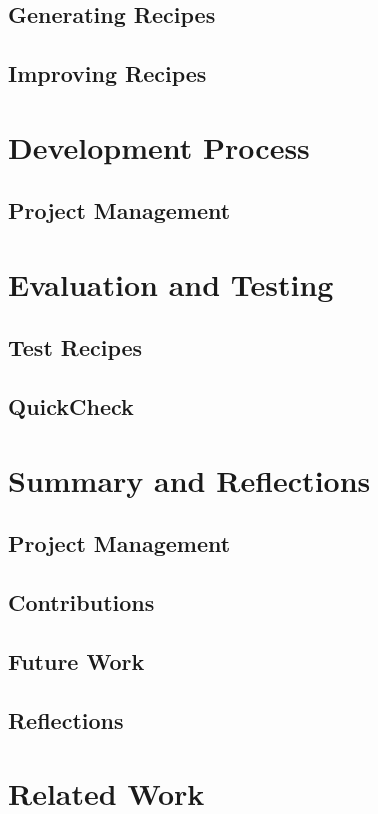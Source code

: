 \documentclass[11pt]{article}
\begin{document}
\subsection{Generating Recipes}
\subsection{Improving Recipes}

\section{Development Process}
\subsection{Project Management}

\section{Evaluation and Testing}
\subsection{Test Recipes}
\subsection{QuickCheck}

\section{Summary and Reflections}
\subsection{Project Management}
\subsection{Contributions}
\subsection{Future Work}
\subsection{Reflections}

\section{Related Work}
\end{document}
